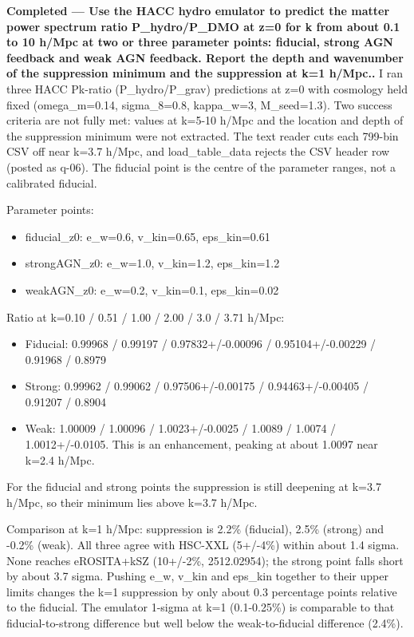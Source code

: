 \documentclass[11pt,a4paper]{article}
\begin{document}
\textbf{Completed --- Use the HACC hydro emulator to predict the matter power spectrum ratio P\_hydro/P\_DMO at z=0 for k from about 0.1 to 10 h/Mpc at two or three parameter points: fiducial, strong AGN feedback and weak AGN feedback. Report the depth and wavenumber of the suppression minimum and the suppression at k=1 h/Mpc..} I ran three HACC Pk-ratio (P\_hydro/P\_grav) predictions at z=0 with cosmology held fixed (omega\_m=0.14, sigma\_8=0.8, kappa\_w=3, M\_seed=1.3). Two success criteria are not fully met: values at k=5-10 h/Mpc and the location and depth of the suppression minimum were not extracted. The text reader cuts each 799-bin CSV off near k=3.7 h/Mpc, and load\_table\_data rejects the CSV header row (posted as q-06). The fiducial point is the centre of the parameter ranges, not a calibrated fiducial.

Parameter points:

\begin{itemize}
  \item fiducial\_z0: e\_w=0.6, v\_kin=0.65, eps\_kin=0.61
  \item strongAGN\_z0: e\_w=1.0, v\_kin=1.2, eps\_kin=1.2
  \item weakAGN\_z0: e\_w=0.2, v\_kin=0.1, eps\_kin=0.02
\end{itemize}
Ratio at k=0.10 / 0.51 / 1.00 / 2.00 / 3.0 / 3.71 h/Mpc:

\begin{itemize}
  \item Fiducial: 0.99968 / 0.99197 / 0.97832+/-0.00096 / 0.95104+/-0.00229 / 0.91968 / 0.8979
  \item Strong: 0.99962 / 0.99062 / 0.97506+/-0.00175 / 0.94463+/-0.00405 / 0.91207 / 0.8904
  \item Weak: 1.00009 / 1.00096 / 1.0023+/-0.0025 / 1.0089 / 1.0074 / 1.0012+/-0.0105. This is an enhancement, peaking at about 1.0097 near k=2.4 h/Mpc.
\end{itemize}
For the fiducial and strong points the suppression is still deepening at k=3.7 h/Mpc, so their minimum lies above k=3.7 h/Mpc.

Comparison at k=1 h/Mpc: suppression is 2.2\% (fiducial), 2.5\% (strong) and -0.2\% (weak). All three agree with HSC-XXL (5+/-4\%) within about 1.4 sigma. None reaches eROSITA+kSZ (10+/-2\%, 2512.02954); the strong point falls short by about 3.7 sigma. Pushing e\_w, v\_kin and eps\_kin together to their upper limits changes the k=1 suppression by only about 0.3 percentage points relative to the fiducial. The emulator 1-sigma at k=1 (0.1-0.25\%) is comparable to that fiducial-to-strong difference but well below the weak-to-fiducial difference (2.4\%).
\end{document}
